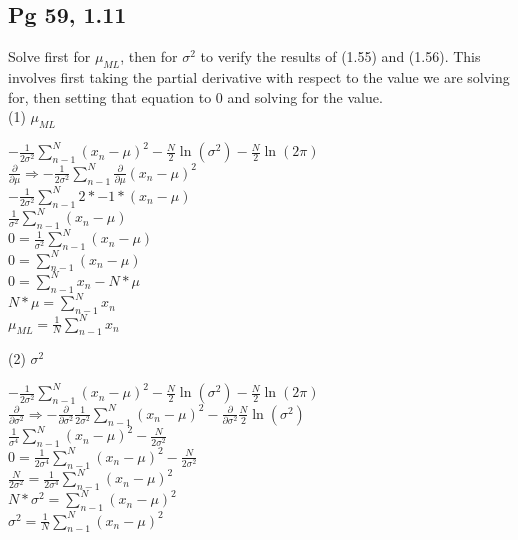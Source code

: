 \documentclass{article}
\begin{document}
    \subsection{Pg 59, 1.11}
    Solve first for $\mu_{ML}$, then for $\sigma^{2}$ to verify the results of (1.55) and (1.56). This
    involves first taking the partial derivative with respect to the value we are solving for, then
    setting that equation to $0$ and solving for the value.\\
    (1) $\mu_{ML}$ \\
    \begin{center}
        $-\frac{1}{2\sigma^2} \sum_{n-1}^{N}(x_n -\mu)^2 - \frac{N}{2}\ln(\sigma^2) - \frac{N}{2}\ln(2\pi)$\\
        $\frac{\partial}{\partial \mu} \Rightarrow -\frac{1}{2\sigma^2} \sum_{n-1}^{N}\frac{\partial}{\partial \mu} (x_n -\mu)^2$\\
        $-\frac{1}{2\sigma^2} \sum_{n-1}^{N} 2 * -1 * (x_n -\mu)$\\
        $\frac{1}{\sigma^2} \sum_{n-1}^{N} (x_n -\mu)$\\
        $0 = \frac{1}{\sigma^2} \sum_{n-1}^{N} (x_n -\mu)$\\
        $0 = \sum_{n-1}^{N} (x_n -\mu)$\\
        $0 = \sum_{n-1}^{N} x_n - N*\mu$\\
        $N * \mu = \sum_{n-1}^{N} x_n$\\
        $\mu_{ML} = \frac{1}{N}\sum_{n-1}^{N} x_n$\\
    \end{center}
    (2) $\sigma^2$ \\
    \begin{center}
        $-\frac{1}{2\sigma^2} \sum_{n-1}^{N}(x_n -\mu)^2 - \frac{N}{2}\ln(\sigma^2) - \frac{N}{2}\ln(2\pi)$\\
        $\frac{\partial}{\partial \sigma^2} \Rightarrow -\frac{\partial}{\partial \sigma^2}\frac{1}{2\sigma^2} \sum_{n-1}^{N} (x_n -\mu)^2 - \frac{\partial}{\partial \sigma^2}\frac{N}{2}\ln(\sigma^2)$\\
        $\frac{1}{\sigma^4} \sum_{n-1}^{N} (x_n -\mu)^2 - \frac{N}{2\sigma^2}$\\
        $0 = \frac{1}{2\sigma^4} \sum_{n-1}^{N} (x_n -\mu)^2 - \frac{N}{2\sigma^2}$\\
        $\frac{N}{2\sigma^2} = \frac{1}{2\sigma^4} \sum_{n-1}^{N} (x_n -\mu)^2 $\\
        $N*\sigma^2 = \sum_{n-1}^{N} (x_n -\mu)^2 $\\
        $\sigma^2 = \frac{1}{N}\sum_{n-1}^{N} (x_n -\mu)^2 $\\
    \end{center}
\end{document}
